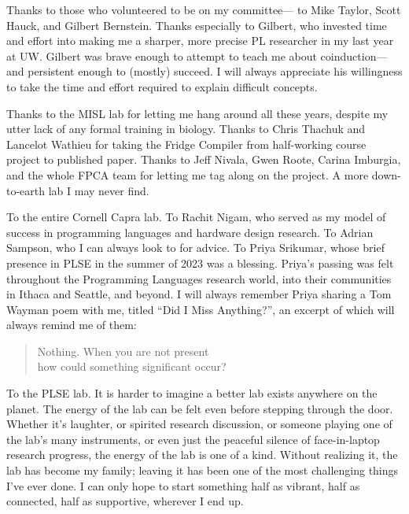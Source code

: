 Thanks to those who volunteered to be on my committee---%
  to Mike Taylor,  Scott Hauck, 
  and Gilbert Bernstein.
Thanks especially to Gilbert,
  who invested time and effort
  into making me a sharper, more precise
  PL researcher
  in my last year at UW.
Gilbert was brave enough to
  attempt to teach me about coinduction---%
  and persistent enough to (mostly) succeed.
I will always appreciate his willingness to
  take the time and effort
  required
  to explain difficult concepts.

Thanks to the MISL lab
  for letting me hang around
  all these years,
  despite my utter lack of any formal
  training in biology.
Thanks to Chris Thachuk
  and Lancelot Wathieu
  for taking the
  Fridge Compiler
  from half-working course project
  to published paper.
Thanks to Jeff Nivala,
  Gwen Roote, Carina Imburgia,
  and the whole
  FPCA team
  for letting me tag along
  on the project.
A more down-to-earth lab I may never find.

To the entire Cornell Capra lab.
To Rachit Nigam, who
  served as my model of 
  success
  in programming languages and hardware design research.
To Adrian Sampson,
  who I can always look to for advice.
To Priya Srikumar,
  whose brief presence in PLSE
  in the summer of 2023
  was a blessing.
Priya's passing was felt
  throughout the Programming Languages
  research world,
  into their communities in Ithaca and Seattle,
  and beyond.
I will always remember Priya sharing
  a Tom Wayman poem with me,
  titled
  ``Did I Miss Anything?'',
  an excerpt of which
  will always remind me of them:
\begin{quote}
Nothing. When you are not present\\
how could something significant occur?
\end{quote}

\clearpage
To the PLSE lab.
It is harder to imagine a
  better lab
  exists anywhere on the planet.
The energy of the lab
  can be felt
  even before stepping through the door.
Whether it's laughter,
  or spirited research discussion,
  or someone playing one of the lab's many instruments,
  or even just the peaceful silence
  of face-in-laptop
  research progress,
  the energy of the lab is one of a kind.
Without realizing it,
  the lab has become my family;
  leaving it
  has been one of the most challenging things
  I've ever done.
I can only hope to start something
  half
  as vibrant, half as connected,
  half as supportive,
  wherever I end up.

